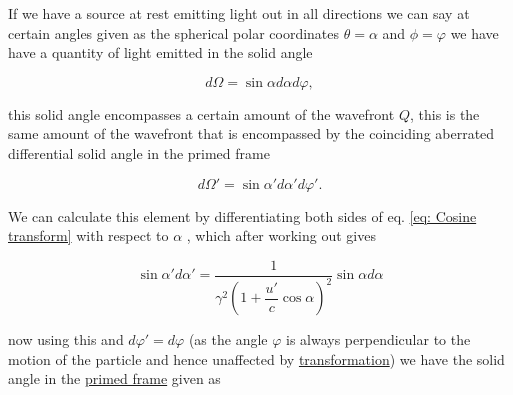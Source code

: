 
If we have a source at rest emitting light out in all directions we can say at certain angles given as the spherical polar coordinates $\theta = \alpha$ and $\phi= \varphi$ we have have a quantity of light emitted in the solid angle

\begin{equation}
	d\Omega = \sin{\alpha} d\alpha d\varphi,
\end{equation}

this solid angle encompasses a certain amount of the wavefront $Q$, this is the same amount of the wavefront that is encompassed by the coinciding aberrated differential solid angle in the primed frame

\begin{equation}
	d\Omega{'} = \sin{\alpha'} d\alpha{'} d\varphi{'}.
\end{equation}

We can calculate this element by differentiating both sides of eq.
\eqref{eq: Cosine transform} with respect to $\alpha$ \cite{hogg1997special}, which after working out gives

\begin{equation}
	\sin{\alpha'} d\alpha{'} = \dfrac{1}{{\gamma}^2\left(1 + \dfrac{u'}{c}\cos{\alpha}\right)^2} \sin{\alpha} d\alpha
\end{equation}

now using this and ${d\varphi{'}} = {d\varphi}$ (as the angle ${\varphi}$ is always perpendicular to the motion of the particle and hence unaffected by \hyperlink{def-transform}{transformation}) we have the solid angle in the \hyperlink{def-Primed-Frame}{primed frame} given as

